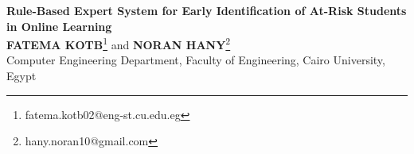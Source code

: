 \documentclass[12pt,a4paper]{article}
\begin{document}
\fontsize{13pt}{19.5pt}\selectfont


\begin{center}

    {\Large \textbf{Rule-Based Expert System for Early Identification of At-Risk Students in Online Learning}}\\[1cm]

    \textbf{FATEMA KOTB}\footnote{fatema.kotb02@eng-st.cu.edu.eg}
    and
    \textbf{NORAN HANY}\footnote{hany.noran10@gmail.com}\\[0.5cm]

    Computer Engineering Department, Faculty of Engineering, Cairo University, Egypt
\end{center}

\vspace{1cm}





\onehalfspacing








\newpage
\printbibliography[title={References}]
\end{document}
